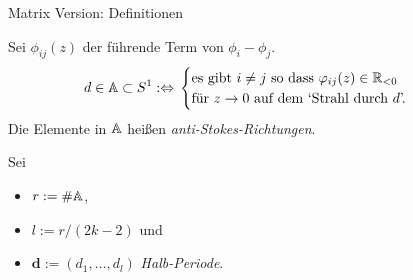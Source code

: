 \begin{frame}[t]{Matrix Version: Definitionen}
  \begin{defn}
    Sei $\phi_{ij}(z)$ der führende Term von $\phi_i-\phi_j$.
    \begin{align*}
    d\in\mathbb{A}\subset S^1
    :\Leftrightarrow{} &
    \begin{cases}
      \text{es gibt $i\neq j$ so dass $\varphi_{ij}(z)\in\mathbb{R}_{<0}$}
    \\\text{für $z\to0$ auf dem `Strahl durch $d$'.}
    \end{cases}
    \end{align*}
    Die Elemente in $\mathbb{A}$ heißen \emph{anti-Stokes-Richtungen}.
  \end{defn}
  Sei
  \begin{itemize}
    \item $r:=\#\mathbb{A}$,
    \item $l:=r/(2k-2)$ und
    \item $\textbf{d}:=(d_1,\dots,d_l)$ \emph{Halb-Periode}.
  \end{itemize}
\end{frame}
